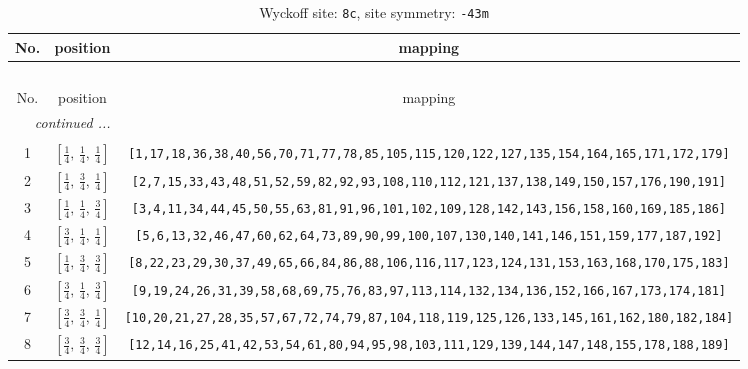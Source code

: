 \documentclass[fleqn,8pt]{jsarticle}
\begin{document}
\begin{longtable}{ccc}
\caption{Wyckoff site: {\tt 8c}, site symmetry: {\tt -43m}}
 \\
 \hline \hline
No. & position & mapping \\ \hline \endfirsthead

\multicolumn{2}{l}{\tablename\ \thetable{}} \\
 \hline \hline
No. & position & mapping \\ \hline \endhead

 \hline \hline
\multicolumn{2}{r}{\footnotesize\it continued ...} \\ \endfoot

 \hline \hline
\multicolumn{2}{r}{} \\ \endlastfoot

1 & $\left[ \frac{1}{4},\, \frac{1}{4},\, \frac{1}{4} \right]$ & {\tt [1,17,18,36,38,40,56,70,71,77,78,85,105,115,120,122,127,135,154,164,165,171,172,179]} \\ \hline
2 & $\left[ \frac{1}{4},\, \frac{3}{4},\, \frac{1}{4} \right]$ & {\tt [2,7,15,33,43,48,51,52,59,82,92,93,108,110,112,121,137,138,149,150,157,176,190,191]} \\ \hline
3 & $\left[ \frac{1}{4},\, \frac{1}{4},\, \frac{3}{4} \right]$ & {\tt [3,4,11,34,44,45,50,55,63,81,91,96,101,102,109,128,142,143,156,158,160,169,185,186]} \\ \hline
4 & $\left[ \frac{3}{4},\, \frac{1}{4},\, \frac{1}{4} \right]$ & {\tt [5,6,13,32,46,47,60,62,64,73,89,90,99,100,107,130,140,141,146,151,159,177,187,192]} \\ \hline
5 & $\left[ \frac{1}{4},\, \frac{3}{4},\, \frac{3}{4} \right]$ & {\tt [8,22,23,29,30,37,49,65,66,84,86,88,106,116,117,123,124,131,153,163,168,170,175,183]} \\ \hline
6 & $\left[ \frac{3}{4},\, \frac{1}{4},\, \frac{3}{4} \right]$ & {\tt [9,19,24,26,31,39,58,68,69,75,76,83,97,113,114,132,134,136,152,166,167,173,174,181]} \\ \hline
7 & $\left[ \frac{3}{4},\, \frac{3}{4},\, \frac{1}{4} \right]$ & {\tt [10,20,21,27,28,35,57,67,72,74,79,87,104,118,119,125,126,133,145,161,162,180,182,184]} \\ \hline
8 & $\left[ \frac{3}{4},\, \frac{3}{4},\, \frac{3}{4} \right]$ & {\tt [12,14,16,25,41,42,53,54,61,80,94,95,98,103,111,129,139,144,147,148,155,178,188,189]} \\
\end{longtable}
\renewcommand{\arraystretch}{1.2}
\end{document}
